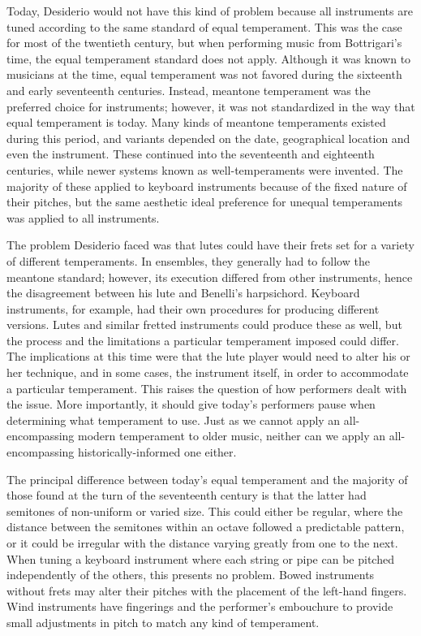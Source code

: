 Today, Desiderio would not have this kind of problem because all instruments are tuned according to
the same standard of equal temperament.  This was the case for most of the twentieth century, but
when performing music from Bottrigari's time, the equal temperament standard does not apply.
Although it was known to musicians at the time, equal temperament was not favored during the
sixteenth and early seventeenth centuries.  Instead, meantone temperament was the preferred choice
for instruments; however, it was not standardized in the way that equal temperament is today.  Many
kinds of meantone temperaments existed during this period, and variants depended on the date,
geographical location and even the instrument.  These continued into the seventeenth and eighteenth
centuries, while newer systems known as well-temperaments were invented.  The majority of these
applied to keyboard instruments because of the fixed nature of their pitches, but the same
aesthetic ideal preference for unequal temperaments was applied to all instruments.

The problem Desiderio faced was that lutes could have their frets set for a variety of different
temperaments.  In ensembles, they generally had to follow the meantone standard; however, its
execution differed from other instruments, hence the disagreement between his lute and Benelli's
harpsichord.  Keyboard instruments, for example, had their own procedures for producing different
versions.  Lutes and similar fretted instruments could produce these as well, but the process and
the limitations a particular temperament imposed could differ. The implications at
this time were that the lute player would need to alter his or her technique, and in some cases, the
instrument itself, in order to accommodate a particular temperament. This raises the question of how
performers dealt with the issue. More importantly, it should give today's performers
pause when determining what temperament to use.  Just as we cannot apply an all- encompassing modern
temperament to older music, neither can we apply an all- encompassing historically-informed one
either.

The principal difference between today's equal temperament and the majority of
those found at the turn of the seventeenth century is that the latter had
semitones of non-uniform or varied size.  This could either be regular, where
the distance between the semitones within an octave followed a predictable
pattern, or it could be irregular with the distance varying greatly from one to
the next. When tuning a keyboard instrument where each string or pipe can be
pitched independently of the others, this presents no problem.  Bowed
instruments without frets may alter their pitches with the placement of the
left-hand fingers.  Wind instruments have fingerings and the performer's
embouchure to provide small adjustments in pitch to match any kind of
temperament.


